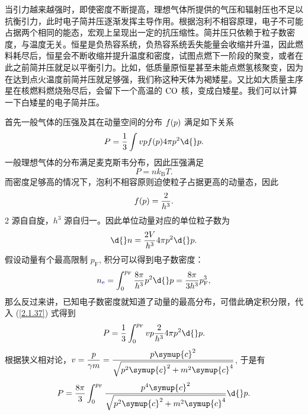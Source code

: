 \documentclass[../天体物理基础.tex]{subfiles}
\begin{document}
当引力越来越强时，即使密度不断提高，理想气体所提供的气压和辐射压也不足以抗衡引力，此时电子简并压逐渐发挥主导作用。根据泡利不相容原理，电子不可能占据两个相同的能态，宏观上呈现出一定的抗压缩性。简并压只依赖于粒子数密度，与温度无关。恒星是负热容系统，负热容系统丢失能量会收缩并升温，因此燃料耗尽后，恒星会不断收缩并提升温度和密度，试图点燃下一阶段的聚变，或者在此之前简并压就足以平衡引力。比如，低质量原恒星甚至未能点燃氢核聚变，因为在达到点火温度前简并压就足够强，我们称这种天体为褐矮星。又比如大质量主序星在核燃料燃烧殆尽后，会留下一个高温的 $\ce{CO}$ 核，变成白矮星。我们可以计算一下白矮星的电子简并压。

首先一般气体的压强及其在动量空间的分布 $f\mleft(p\mright)$ 满足如下关系
\begin{equation}
P=\frac{1}{3}\int vpf\mleft(p\mright) 4\pi p^{2}\d{}p.\label{2.1.37}
\end{equation}
一般理想气体的分布满足麦克斯韦分布，因此压强满足
\begin{equation}
P=nk_{\mathrm{B}}T.
\end{equation}
而密度足够高的情况下，泡利不相容原则迫使粒子占据更高的动量态，因此
\begin{equation}
f\mleft(p\mright)=\frac{2}{h^{3}}.
\end{equation}
2 源自自旋，$h^{3}$ 源自归一。因此单位动量对应的单位粒子数为
\begin{equation}
\d{}n=\frac{2V}{h^{3}}4\pi p^{2}\d{}p.
\end{equation}
假设动量有个最高限制 $p_{\mathrm{F}}$, 积分可以得到电子数密度：
\begin{equation}
n_{{\color{blue}{\ce{e}}}}=\int_{0}^{p_{\mathrm{F}}}\frac{8\pi}{h^{3}}p^{2}\d{}p=\frac{8\pi}{3h^{3}}p_{\mathrm{F}}^{3},
\end{equation}
那么反过来讲，已知电子数密度就知道了动量的最高分布，可借此确定积分限，代入 (\ref{2.1.37}) 式得到
\begin{equation}
P=\frac{1}{3}\int_{0}^{p_{\mathrm{F}}}vp\frac{2}{h^{3}}4\pi p^{2}\d{}p.
\end{equation}
根据狭义相对论，$v=\dfrac{p}{\gamma m}=\dfrac{p\symup{c}^{2}}{\sqrt{p^{2}\symup{c}^{2}+m^{2}\symup{c}^{4}}}$, 于是有
\begin{equation}
P=\frac{8\pi}{3}\int_{0}^{p_{\mathrm{F}}}\frac{p^{4}\symup{c}^{2}}{\sqrt{p^{2}\symup{c}^{2}+m^{2}\symup{c}^{4}}}\d{}p.\label{2.1.46}
\end{equation}
\end{document}
